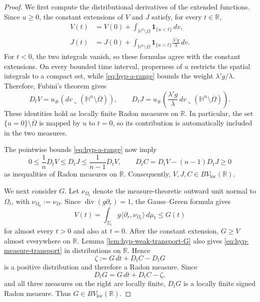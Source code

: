 \documentclass[11pt,reqno]{amsart}
\numberwithin{equation}{section}
\theoremstyle{definition}
\newcommand{\diver}{\operatorname{div}}
\newcommand{\HH}{\mathbb H}
\begin{document}
\begin{proof}
We first compute the distributional derivatives of the extended
functions. Since $u\geq0$, the constant extensions of $V$ and $J$
satisfy, for every $t\in\mathbb R$,
\begin{align*}
    V(t)
    &=V(0)+\int_{\HH^n\setminus\overline\Omega}
      \mathbf 1_{\{u<t\}}\,dv,\\
    J(t)
    &=J(0)+\int_{\HH^n\setminus\overline\Omega}
      \mathbf 1_{\{u<t\}}
      \frac{\lambda'g}{\lambda}\,dv.
\end{align*}
For $t<0$, the two integrals vanish, so these formulas agree with the
constant extensions. On every bounded time interval, properness of $u$
restricts the spatial integrals to a compact set, while
\eqref{eq:hyp-a-range} bounds the weight $\lambda'g/\lambda$.
Therefore, Fubini's theorem gives
\begin{equation*}
    D_tV
    =u_\#\left(
      dv\mathbin{\llcorner}
      (\HH^n\setminus\overline\Omega)\right),
    \qquad
    D_tJ
    =u_\#\left(
      \frac{\lambda'g}{\lambda}\,dv
      \mathbin{\llcorner}
      (\HH^n\setminus\overline\Omega)\right).
\end{equation*}
These identities hold as locally finite Radon measures on $\mathbb R$.
In particular, the set
$\{u=0\}\setminus\overline\Omega$ is mapped by $u$ to $t=0$, so its
contribution is automatically included in the two measures.

The pointwise bounds \eqref{eq:hyp-a-range} now imply
\begin{equation}\label{equ-dtV}
    0\leq\frac1nD_tV
    \leq D_tJ
    \leq\frac1{n-1}D_tV,
    \qquad
    D_tC=D_tV-(n-1)D_tJ\geq0
\end{equation}
as inequalities of Radon measures on $\mathbb R$. Consequently, $V,J,C\in BV_{\mathrm{loc}}(\mathbb R)$. 

We next consider $G$. Let $\nu_{\Omega_t}$ denote the
measure-theoretic outward unit normal to $\Omega_t$, with
$\nu_{\Omega_0}:=\nu_\Omega$. Since $\diver(g\partial_r)=1$, the Gauss--Green formula gives
\begin{equation*}
    V(t)
    =\int_{\Sigma_t}
      g\langle\partial_r,\nu_{\Omega_t}\rangle\,d\mu_t
    \leq G(t)
\end{equation*}
for almost every $t>0$ and also at $t=0$. After the constant extension, $G\geq V$ almost everywhere on $\mathbb R$. Lemma \ref{lem:hyp-weak-transport-G} also gives \eqref{eq:hyp-measure-transport} in distributions on $\mathbb R$. Hence 
$$\zeta:=G\,dt+D_tC-D_tG$$
is a positive distribution and therefore a Radon measure. Since
\begin{equation*}
    D_tG=G\,dt+D_tC-\zeta,
\end{equation*}
and all three measures on the right are locally finite, $D_tG$ is
a locally finite signed Radon measure. Thus $G\in BV_{\mathrm{loc}}(\mathbb R)$.


\end{proof}
\end{document}
